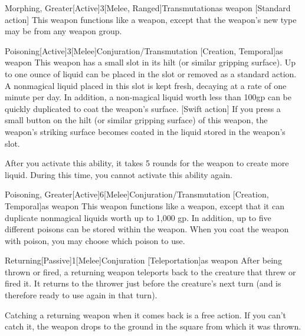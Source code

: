         \begin{magicitemdef}{Morphing, Greater}[Active]{3}[Melee, Ranged]{Transmutation}{as weapon}
            [Standard action] This weapon functions like a  weapon, except that the weapon's new type may be from any weapon group.
        \end{magicitemdef}

        \begin{magicitemdef}{Poisoning}[Active]{3}[Melee]{Conjuration/Transmutation [Creation, Temporal]}{as weapon}
             This weapon has a small slot in its hilt (or similar gripping surface). Up to one ounce of liquid can be placed in the slot or removed as a standard action. A nonmagical liquid placed in this slot is kept fresh, decaying at a rate of one minute per day. In addition, a non-magical liquid worth less than 100gp can be quickly duplicated to coat the weapon's surface.
            [Swift action] If you press a small button on the hilt (or similar gripping surface) of this weapon, the weapon's striking surface becomes coated in the liquid stored in the weapon's slot.

            After you activate this ability, it takes 5 rounds for the weapon to create more liquid.
            During this time, you cannot activate this ability again.
        \end{magicitemdef}

        \begin{magicitemdef}{Poisoning, Greater}[Active]{6}[Melee]{Conjuration/Transmutation [Creation, Temporal]}{as weapon}
             This weapon functions like a  weapon, except that it can duplicate nonmagical liquids worth up to 1,000 gp.
            In addition, up to five different poisons can be stored within the weapon.
            When you coat the weapon with poison, you may choose which poison to use.
        \end{magicitemdef}

        \begin{magicitemdef}{Returning}[Passive]{1}[Melee]{Conjuration [Teleportation]}{as weapon}
             After being thrown or fired, a returning weapon teleports back to the creature that threw or fired it.
            It returns to the thrower just before the creature's next turn (and is therefore ready to use again in that turn).

            Catching a returning weapon when it comes back is a free action.
            If you can't catch it, the weapon drops to the ground in the square from which it was thrown.
        \end{magicitemdef}

